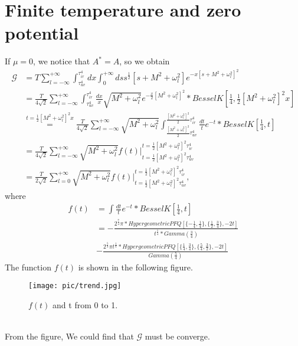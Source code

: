 \documentclass{article}
\begin{document}
\section{Finite temperature and zero potential}
If $\mu=0$, we notice that $A^*=A$, so we obtain
\begin{equation}
    \begin{split}
        \mathcal{G} &=T\sum_{l=-\infty}^{+\infty}\int_{\tau_{uv}^4}^{\tau_{ir}^4}dx\int_{0}^{+\infty}ds s^{\frac{1}{2}}[s+M^2+\omega_l^2]e^{-x[s+M^2+\omega_l^2]^2}\\
        &=\frac{T}{4\sqrt{2}}\sum_{l=-\infty}^{+\infty}\int_{\tau_{uv}^4}^{\tau_{ir}^4}\frac{dx}{x}\sqrt{M^2+\omega_l^2}e^{-\frac{x}{2}[M^2+\omega_l^2]^2}*BesselK[\frac{1}{4},\frac{1}{2}[M^2+\omega_l^2]^2x]\\
        &\stackrel{t=\frac{1}{2}[M^2+\omega_l^2]^2x}{=}\frac{T}{4\sqrt{2}}\sum_{l=-\infty}^{+\infty}\sqrt{M^2+\omega_l^2}\int_{\frac{[M^2+\omega_l^2]^2}{2}\tau_{uv}^4}^{\frac{[M^2+\omega_l^2]^2}{2}\tau_{ir}^4}\frac{dt}{t}e^{-t}*BesselK[\frac{1}{4},t]\\
        &=\frac{T}{4\sqrt{2}}\sum_{l=-\infty}^{+\infty}\sqrt{M^2+\omega_l^2}f(t)|_{t=\frac{1}{2}[M^2+\omega_l^2]^2\tau_{uv}^4}^{t=\frac{1}{2}[M^2+\omega_l^2]^2\tau_{ir}^4}\\
        &=\frac{T}{2\sqrt{2}}\sum_{l=0}^{+\infty}\sqrt{M^2+\omega_l^2}f(t)|_{t=\frac{1}{2}[M^2+\omega_l^2]^2\tau_{uv}^4}^{t=\frac{1}{2}[M^2+\omega_l^2]^2\tau_{ir}^4}  ,
    \end{split}
\end{equation}
where
\begin{equation}
    \begin{split}
        f(t)&=\int\frac{dt}{t}e^{-t}*BesselK[\frac{1}{4},t]\\
        &=-\frac{2^{\frac{7}{4}}\pi*HypergeometricPFQ[\{-\frac{1}{4},\frac{1}{4}\},\{\frac{1}{2},\frac{3}{4}\},-2t]}{t^{\frac{1}{4}}*Gamma(\frac{3}{4})}\\
        &-\frac{2^{\frac{5}{4}}\pi t^{\frac{1}{4}}*HypergeometricPFQ[\{\frac{1}{4},\frac{3}{4}\},\{\frac{5}{4},\frac{3}{2}\},-2t]}{Gamma(\frac{5}{4})}
    \end{split}
\end{equation}
The function $f(t)$ is shown in the following figure.
\begin{figure}[!htb]
    \centering
    \texttt{[image: pic/trend.jpg]}
    \caption{$f(t)$ and t from 0 to 1.}
\end{figure}
\\From the figure, We could find that $\mathcal{G}$ must be converge.\\
\end{document}
